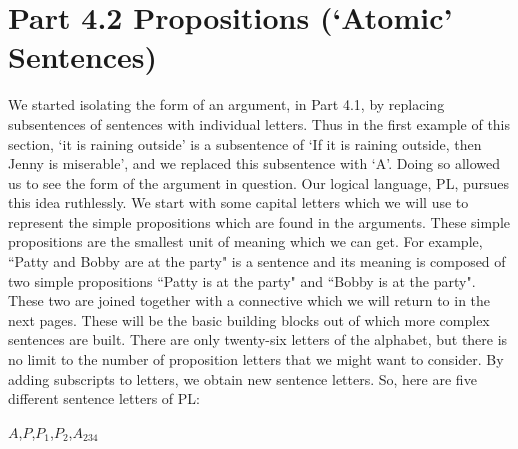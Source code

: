 \section{Part 4.2 Propositions (‘Atomic’ Sentences)}
We started isolating the form of an argument, in Part 4.1, by replacing subsentences of sentences with individual letters. Thus in the first example of this section, ‘it is raining outside’ is a subsentence of ‘If it is raining outside, then Jenny is miserable’, and we replaced this subsentence with ‘A’. Doing so allowed us to see the form of the argument in question. Our logical language, PL, pursues this idea ruthlessly. We start with some capital letters which we will use to represent the simple propositions which are found in the arguments. These simple propositions are the smallest unit of meaning which we can get. For example, “Patty and Bobby are at the party" is a sentence and its meaning is composed of two simple propositions “Patty is at the party" and “Bobby is at the party". These two are joined together with a connective which we will return to in the next pages. These will be the basic building blocks out of which more complex sentences are built. There are only twenty-six letters of the alphabet, but there is no limit to the number of proposition letters that we might want to consider. By adding subscripts to letters, we obtain new \glspl{sentence letter}. So, here are five different sentence letters of PL:
\begin{center}$A$,$P$,$P_1$,$P_2$,$A_{234}$\end{center}

